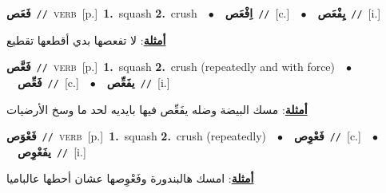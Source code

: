 \documentclass[10pt,a4paper,twoside]{article} %
\begin{document}
\begin{multicols}{2}
{\setlength\topsep{0pt}\textbf{\foreignlanguage{arabic}{فَعَص}}\ {\color{gray}\texttt{//}\color{black}}\ \textsc{verb}\ [p.]\ \textbf{1.}~squash  \textbf{2.}~crush\ \ $\bullet$\ \ \setlength\topsep{0pt}\textbf{\foreignlanguage{arabic}{اِفْعَص}}\ {\color{gray}\texttt{//}\color{black}}\ [c.]\ \ $\bullet$\ \ \setlength\topsep{0pt}\textbf{\foreignlanguage{arabic}{يِفْعَص}}\ {\color{gray}\texttt{//}\color{black}}\ [i.]\  \begin{flushright}\color{gray}\foreignlanguage{arabic}{\textbf{\underline{\foreignlanguage{arabic}{أمثلة}}}: لا تفعصها بدي أقطعها تقطيع}\end{flushright}\color{black}} \vspace{2mm}

{\setlength\topsep{0pt}\textbf{\foreignlanguage{arabic}{فَعَّص}}\ {\color{gray}\texttt{//}\color{black}}\ \textsc{verb}\ [p.]\ \textbf{1.}~squash  \textbf{2.}~crush (repeatedly and with force)\ \ $\bullet$\ \ \setlength\topsep{0pt}\textbf{\foreignlanguage{arabic}{فَعِّص}}\ {\color{gray}\texttt{//}\color{black}}\ [c.]\ \ $\bullet$\ \ \setlength\topsep{0pt}\textbf{\foreignlanguage{arabic}{يفَعِّص}}\ {\color{gray}\texttt{//}\color{black}}\ [i.]\  \begin{flushright}\color{gray}\foreignlanguage{arabic}{\textbf{\underline{\foreignlanguage{arabic}{أمثلة}}}: مسك البيضة وضله يفَعِّص فيها بايديه لحد ما وسخ الأرضيات}\end{flushright}\color{black}} \vspace{2mm}

{\setlength\topsep{0pt}\textbf{\foreignlanguage{arabic}{فَعْوَص}}\ {\color{gray}\texttt{//}\color{black}}\ \textsc{verb}\ [p.]\ \textbf{1.}~squash  \textbf{2.}~crush (repeatedly)\ \ $\bullet$\ \ \setlength\topsep{0pt}\textbf{\foreignlanguage{arabic}{فَعْوِص}}\ {\color{gray}\texttt{//}\color{black}}\ [c.]\ \ $\bullet$\ \ \setlength\topsep{0pt}\textbf{\foreignlanguage{arabic}{يفَعْوِص}}\ {\color{gray}\texttt{//}\color{black}}\ [i.]\  \begin{flushright}\color{gray}\foreignlanguage{arabic}{\textbf{\underline{\foreignlanguage{arabic}{أمثلة}}}: امسك هالبندورة وفَعْوِصها عشان أحطها عالباميا}\end{flushright}\color{black}} \vspace{2mm}


\end{multicols}
\end{document}
